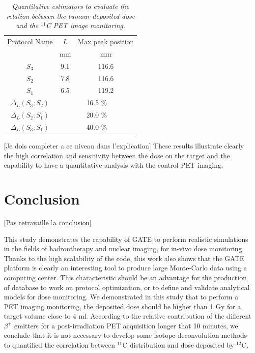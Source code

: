 \documentclass[11pt]{iopart}
\newcommand{\sjnote}[1]{{\color{red}[#1]}}
\begin{document}
\begin{table}[htbp]
\begin{center}
\begin{tabular}{|c|c|c|} \hline
 Protocol Name                & $L$            & Max peak position       \\
                              &  mm                  & mm                       \\ \hline \hline
$S_{3}$                       & 9.1                  &  116.6                       \\ \hline
$S_{2}$                       & 7.8                  &  116.6                 \\ \hline
$S_{1}$                       & 6.5                  &  119.2            \\ \hline 
$\Delta_{L}(S_{3};S_{2})$         &       \multicolumn{2}{c|}{16.5 $\%$}  \\ \hline
$\Delta_{L}(S_{2};S_{1})$         &        \multicolumn{2}{c|}{20.0 $\%$} \\ \hline
$\Delta_{L}(S_{3};S_{1})$         &        \multicolumn{2}{c|}{40.0 $\%$}  \\ \hline \hline
\end{tabular}
\end{center} 
\caption{\it Quantitative estimators to evaluate the relation between the tumour deposited dose and the $^{11}$C PET image monitoring.}
\label{tab:dose}
\end{table}
\sjnote{Je dois completer a ce niveau dans l'explication}
These results illustrate clearly the high correlation and sensitivity between the dose on the target and the capability to have a quantitative analysis with the control PET imaging.

\clearpage
\section{Conclusion}

\sjnote{Pas retravaille la conclusion}

This study demonstrates the capability of GATE to perform realistic
simulations in the fields of hadrontherapy and nuclear imaging, for
in-vivo dose monitoring. Thanks to the high scalability of the code,
this work also shows that the GATE platform is clearly an interesting
tool to produce large Monte-Carlo data using a computing center. This
characteristic should be an advantage for the production of database
to work on protocol optimization, or to define and validate analytical
models for dose monitoring. We demonstrated in this study that to
perform a PET imaging monitoring, the deposited dose should be higher
than 1 Gy for a target volume close to 4 ml. According to the relative
contribution of the different $\beta^+$ emitters for a
post-irradiation PET acquisition longer that 10 minutes, we conclude
that it is not necessary to develop some isotope deconvolution methods
to quantified the correlation between $^{11}$C distribution and dose
deposited by $^{12}$C.
\end{document}
